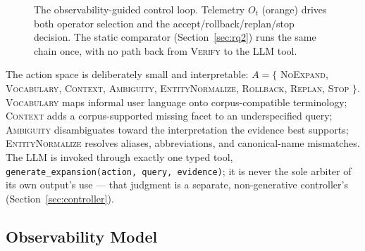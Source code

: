 \documentclass[conference]{IEEEtran}
\begin{document}
\begin{figure}[t]
{
}
\caption{The observability-guided control loop. Telemetry $O_t$ (orange) drives both operator selection and the accept/rollback/replan/stop decision. The static comparator (Section~\ref{sec:rq2}) runs the same chain once, with no path back from \textsc{Verify} to the LLM tool.}
\label{fig:architecture}
\end{figure}

The action space is deliberately small and interpretable: $A=\{$
\textsc{NoExpand}, \textsc{Vocabulary}, \textsc{Context},
\textsc{Ambiguity}, \textsc{EntityNormalize}, \textsc{Rollback},
\textsc{Replan}, \textsc{Stop} $\}$.
\textsc{Vocabulary} maps informal user language onto
corpus-compatible terminology; \textsc{Context} adds a corpus-supported
missing facet to an underspecified query; \textsc{Ambiguity}
disambiguates toward the interpretation the evidence best supports;
\textsc{EntityNormalize} resolves aliases, abbreviations, and
canonical-name mismatches. The LLM is invoked through exactly one typed
tool, \texttt{generate\_expansion(action, query, evidence)}; it is
never the sole arbiter of its own output's use --- that judgment is a
separate, non-generative controller's (Section~\ref{sec:controller}).

\subsection{Observability Model}
\label{sec:observability}
\end{document}
